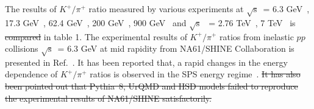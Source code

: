\documentclass{article}
\newcommand{\sqrts}{\mbox{$\sqrt{\mathrm{s}}$}}
\providecommand{\DIFadd}[1]{{\protect\color{blue}\uwave{#1}}} %
\providecommand{\DIFdel}[1]{{\protect\color{red}\sout{#1}}}                      %
\providecommand{\DIFaddbegin}{} %
\providecommand{\DIFaddend}{} %
\providecommand{\DIFdelbegin}{} %
\providecommand{\DIFdelend}{} %
\begin{document}
\DIFdelend The results of $K^+/\pi^+$ ratio measured by various experiments at \sqrts~= 6.3 GeV~\cite{Pulawski:2015tka}, 17.3 GeV~\cite{NA49:2009brx}, 62.4 GeV~\cite{PHENIX:2011rvu}, 200 GeV~\cite{STAR:2008med}, 900 GeV~\cite{ALICE:2011gmo} and \sqrts~ = 2.76 TeV~\cite{ALICE:2015ial}, 7 TeV~\cite{ALICE:2015ial} is \DIFdelbegin \DIFdel{compared }\DIFdelend \DIFaddbegin \DIFadd{listed }\DIFaddend in table 1. The experimental results of $K^+/\pi^+$ ratios from inelastic $pp$ collisions \sqrts~= 6.3 GeV at mid rapidity from NA61/SHINE Collaboration is presented in Ref.~\cite{Pulawski:2015tka}. It has been reported that, a rapid changes in the energy dependence of $K^+/\pi^+$ ratios is observed in the SPS energy regime~\cite{Pulawski:2015tka}. \DIFdelbegin \DIFdel{It has also been pointed out that Pythia~8, UrQMD and HSD models failed to reproduce the experimental results of NA61/SHINE satisfactorily.           
}\DIFdelend %
\end{document}
